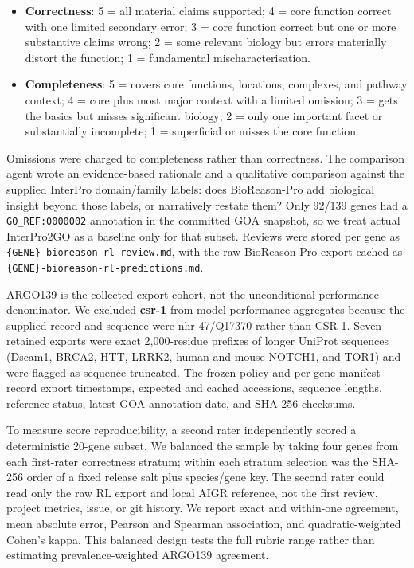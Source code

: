 \documentclass[
  11pt,
]{article}
\providecommand{\tightlist}{%
  \setlength{\itemsep}{0pt}\setlength{\parskip}{0pt}}
\begin{document}
\begin{itemize}
\tightlist
\item
  \textbf{Correctness}: 5 = all material claims supported; 4 = core function
  correct with one limited secondary error; 3 = core function correct but
  one or more substantive claims wrong; 2 = some relevant biology but errors
  materially distort the function; 1 = fundamental mischaracterisation.
\item
  \textbf{Completeness}: 5 = covers core functions, locations, complexes,
  and pathway context; 4 = core plus most major context with a limited
  omission; 3 = gets the basics but misses significant biology; 2 = only
  one important facet or substantially incomplete; 1 = superficial or
  misses the core function.
\end{itemize}

Omissions were charged to completeness rather than correctness. The
comparison agent wrote an evidence-based rationale and a qualitative
comparison against the supplied InterPro domain/family labels: does
BioReason-Pro add biological insight beyond those labels, or narratively
restate them? Only 92/139 genes had a \texttt{GO\_REF:0000002} annotation
in the committed GOA snapshot, so we treat actual InterPro2GO as a baseline
only for that subset. Reviews
were stored per gene as \texttt{\{GENE\}-bioreason-rl-review.md}, with
the raw BioReason-Pro export cached as
\texttt{\{GENE\}-bioreason-rl-predictions.md}.

ARGO139 is the collected export cohort, not the unconditional performance
denominator. We excluded \textbf{csr-1} from model-performance aggregates
because the supplied record and sequence were nhr-47/Q17370 rather than
CSR-1. Seven retained exports were exact 2,000-residue prefixes of longer
UniProt sequences (Dscam1, BRCA2, HTT, LRRK2, human and mouse NOTCH1, and
TOR1) and were flagged as sequence-truncated. The frozen policy and
per-gene manifest record export timestamps, expected and cached accessions,
sequence lengths, reference status, latest GOA annotation date, and SHA-256
checksums.

To measure score reproducibility, a second rater independently scored a
deterministic 20-gene subset. We balanced the sample by taking four genes
from each first-rater correctness stratum; within each stratum selection was
the SHA-256 order of a fixed release salt plus species/gene key. The second
rater could read only the raw RL export and local AIGR reference, not the
first review, project metrics, issue, or git history. We report exact and
within-one agreement, mean absolute error, Pearson and Spearman association,
and quadratic-weighted Cohen's kappa. This balanced design tests the full
rubric range rather than estimating prevalence-weighted ARGO139 agreement.
\end{document}
